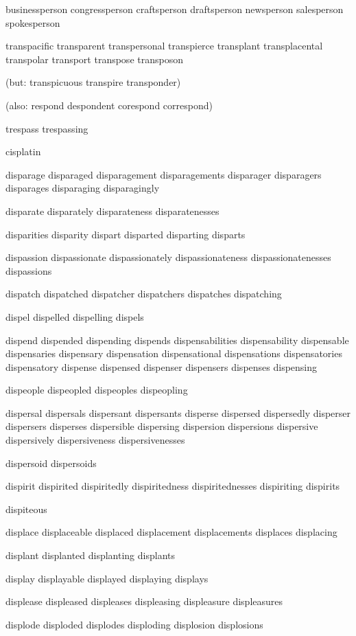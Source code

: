 \begin{itemize}
businessperson congressperson craftsperson draftsperson newsperson salesperson spokesperson

transpacific transparent transpersonal transpierce  transplant transplacental transpolar transport transpose transposon

(but: transpicuous transpire transponder)

(also: respond despondent corespond correspond)

trespass trespassing

cisplatin

disparage disparaged disparagement disparagements disparager disparagers disparages disparaging disparagingly

disparate disparately disparateness disparatenesses

disparities disparity dispart disparted disparting disparts

dispassion dispassionate dispassionately dispassionateness dispassionatenesses dispassions

dispatch dispatched dispatcher dispatchers dispatches dispatching

dispel dispelled dispelling dispels

dispend dispended dispending dispends dispensabilities dispensability dispensable dispensaries dispensary dispensation dispensational dispensations dispensatories dispensatory dispense dispensed dispenser dispensers dispenses dispensing

dispeople dispeopled dispeoples dispeopling

dispersal dispersals dispersant dispersants disperse dispersed dispersedly disperser dispersers disperses dispersible dispersing dispersion dispersions dispersive dispersively dispersiveness dispersivenesses

dispersoid dispersoids

dispirit dispirited dispiritedly dispiritedness dispiritednesses dispiriting dispirits

dispiteous

displace displaceable displaced displacement displacements displaces displacing

displant displanted displanting displants

display displayable displayed displaying displays

displease displeased displeases displeasing displeasure displeasures

displode disploded displodes disploding displosion displosions


\end{itemize}

